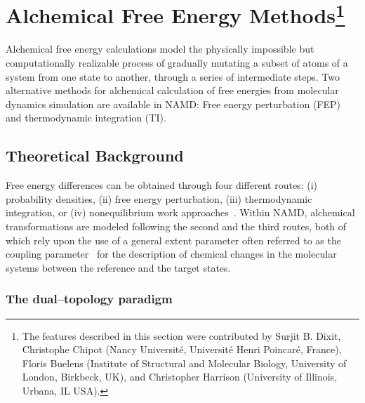 \section{Alchemical Free Energy Methods\footnote[1]{The features described in this section were contributed by Surjit B. Dixit, Christophe Chipot (Nancy Universit{\'e}, Universit{\'e} Henri Poincar{\'e}, France), Floris Buelens (Institute of Structural and Molecular Biology, University of London, Birkbeck, UK), and Christopher Harrison (University of Illinois, Urbana, IL USA).}}
\label{section:alchemy}

Alchemical free energy calculations model the physically impossible but
computationally realizable process of gradually mutating a subset of atoms of a
system from one state to another, through a series of intermediate steps. Two
alternative methods for alchemical calculation of free energies from molecular
dynamics simulation are available in NAMD: Free energy perturbation (FEP) and
thermodynamic integration (TI).



\subsection{Theoretical Background}

Free energy differences can be obtained through four different routes: (i)
probability densities, (ii) free energy perturbation, (iii) thermodynamic
integration, or (iv) nonequilibrium work approaches~\cite{Chipot2007}.  Within
NAMD, alchemical transformations are modeled following the second and the third
routes, both of which rely upon the use of a general extent parameter often
referred to as the coupling
parameter~\cite{Beveridge1989,Mark1998,King1993,Kirkwood1935} for the
description of chemical changes in the molecular systems between the reference
and the target states.


\subsubsection{The dual--topology paradigm}


